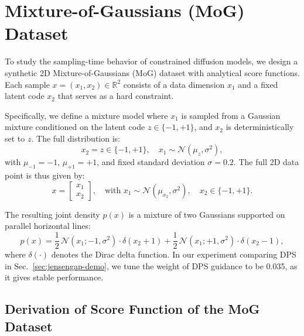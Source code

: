 \documentclass{article}
\theoremstyle{plain}
\theoremstyle{definition}
\theoremstyle{remark}
\begin{document}
\section{Mixture-of-Gaussians (MoG) Dataset}

To study the sampling-time behavior of constrained diffusion models, we design a synthetic 2D Mixture-of-Gaussians (MoG) dataset with analytical score functions. Each sample $x = (x_1, x_2) \in \mathbb{R}^2$ consists of a data dimension $x_1$ and a fixed latent code $x_2$ that serves as a hard constraint.

Specifically, we define a mixture model where $x_1$ is sampled from a Gaussian mixture conditioned on the latent code $z \in \{-1, +1\}$, and $x_2$ is deterministically set to $z$. The full distribution is:
\begin{equation}
x_2 = z \in \{-1, +1\}, \quad x_1 \sim \mathcal{N}(\mu_z, \sigma^2),
\end{equation}
with $\mu_{-1} = -1$, $\mu_{+1} = +1$, and fixed standard deviation $\sigma = 0.2$. The full 2D data point is thus given by:
\begin{equation}
x = \begin{bmatrix} x_1 \\ x_2 \end{bmatrix}, \quad \text{with } x_1 \sim \mathcal{N}(\mu_{x_2}, \sigma^2), \quad x_2 \in \{-1, +1\}.
\end{equation}

The resulting joint density $p(x)$ is a mixture of two Gaussians supported on parallel horizontal lines:
\begin{equation}
p(x) = \frac{1}{2} \, \mathcal{N}(x_1; -1, \sigma^2) \cdot \delta(x_2 + 1) + \frac{1}{2} \, \mathcal{N}(x_1; +1, \sigma^2) \cdot \delta(x_2 - 1),
\end{equation}
where $\delta(\cdot)$ denotes the Dirac delta function. In our experiment comparing DPS in Sec.~\ref{sec:jensengap-demo}, we tune the weight of DPS guidance to be 0.035, as it gives stable performance.

\subsection{Derivation of Score Function of the MoG Dataset}\label{appendix:mog-score-calculate}
\end{document}
